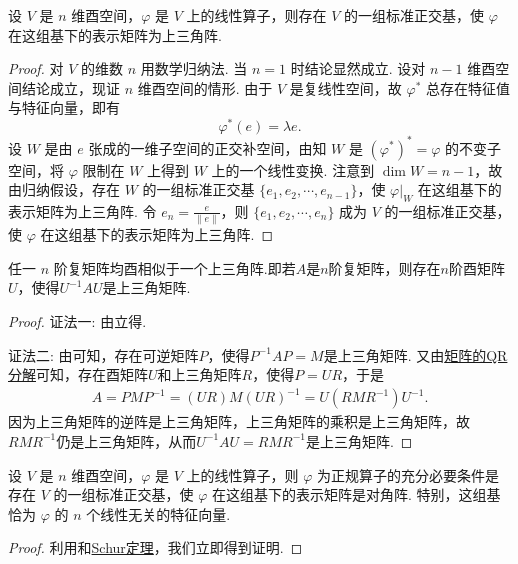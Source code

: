 \documentclass[../../main.tex]{subfiles}%
\begin{document}
\begin{theorem}[Schur(舒尔)定理]\label{theorem:Schur(舒尔)定理}
设 $V$ 是 $n$ 维酉空间，$\varphi$ 是 $V$ 上的线性算子，则存在 $V$ 的一组标准正交基，使 $\varphi$ 在这组基下的表示矩阵为上三角阵.
\end{theorem}
\begin{proof}
对 $V$ 的维数 $n$ 用数学归纳法. 当 $n = 1$ 时结论显然成立. 设对 $n - 1$ 维酉空间结论成立，现证 $n$ 维酉空间的情形. 由于 $V$ 是复线性空间，故 $\varphi^*$ 总存在特征值与特征向量，即有
\[
\varphi^*(e) = \lambda e.
\]
设 $W$ 是由 $e$ 张成的一维子空间的正交补空间，由知 $W$ 是 $(\varphi^*)^* = \varphi$ 的不变子空间，将 $\varphi$ 限制在 $W$ 上得到 $W$ 上的一个线性变换. 注意到 $\dim W = n - 1$，故由归纳假设，存在 $W$ 的一组标准正交基 $\{e_1,e_2,\cdots,e_{n - 1}\}$，使 $\varphi|_W$ 在这组基下的表示矩阵为上三角阵. 令 $e_n = \frac{e}{\|e\|}$，则 $\{e_1,e_2,\cdots,e_n\}$ 成为 $V$ 的一组标准正交基，使 $\varphi$ 在这组基下的表示矩阵为上三角阵.
\end{proof}

\begin{corollary}[Schur定理]\label{corollary:Schur(舒尔)定理}
任一 $n$ 阶复矩阵均酉相似于一个上三角阵.即若\(A\)是\(n\)阶复矩阵，则存在\(n\)阶酉矩阵\(U\)，使得\(U^{-1}AU\)是上三角矩阵.
\end{corollary}
\begin{proof}

{\color{blue}证法一:}
由立得.

{\color{blue}证法二:}
由可知，存在可逆矩阵\(P\)，使得\(P^{-1}AP = M\)是上三角矩阵. 又由\hyperref[theorem:矩阵的QR分解]{矩阵的QR分解}可知，存在酉矩阵\(U\)和上三角矩阵\(R\)，使得\(P = UR\)，于是
\begin{align*}
A = PMP^{-1}=(UR)M(UR)^{-1}=U(RMR^{-1})U^{-1}.
\end{align*}
因为上三角矩阵的逆阵是上三角矩阵，上三角矩阵的乘积是上三角矩阵，故\(RMR^{-1}\)仍是上三角矩阵，从而\(U^{-1}AU = RMR^{-1}\)是上三角矩阵. 
\end{proof}

\begin{theorem}
设 $V$ 是 $n$ 维酉空间，$\varphi$ 是 $V$ 上的线性算子，则 $\varphi$ 为正规算子的充分必要条件是存在 $V$ 的一组标准正交基，使 $\varphi$ 在这组基下的表示矩阵是对角阵. 特别，这组基恰为 $\varphi$ 的 $n$ 个线性无关的特征向量.
\end{theorem}
\begin{proof}
利用和\hyperref[corollary:Schur(舒尔)定理]{Schur定理}，我们立即得到证明.
\end{proof}
\end{document}
